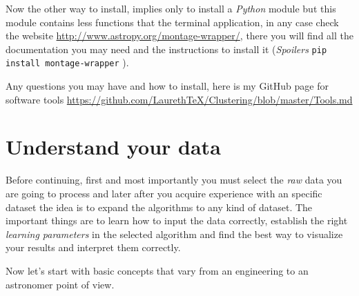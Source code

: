 \documentclass[11pt,fleqn]{book} %
\begin{document}
\begin{description}
\begin{enumerate}
    \end{enumerate}
    
    
    
      Now the other way to install, implies only to install a \emph{Python} module but this module contains less functions that the terminal application, in any case check the website \url{http://www.astropy.org/montage-wrapper/}, there you will find all the documentation you may need and the instructions to install it (\emph{Spoilers} \verb|pip install montage-wrapper| ).\\
\end{description}

Any questions you may have and how to install, here is my GitHub page for software tools \url{https://github.com/LaurethTeX/Clustering/blob/master/Tools.md}


\chapter{Understand your data}

Before continuing, first and most importantly you must select the \emph{raw} data you are going to process and later after you acquire experience with an specific dataset the idea is to expand the algorithms to any kind of dataset. The important things are to learn how to input the data correctly, establish the right \emph{learning parameters} in the selected algorithm and find the best way to visualize your results and interpret them correctly.

Now let's start with basic concepts that vary from an engineering to an astronomer point of view.
\end{document}

